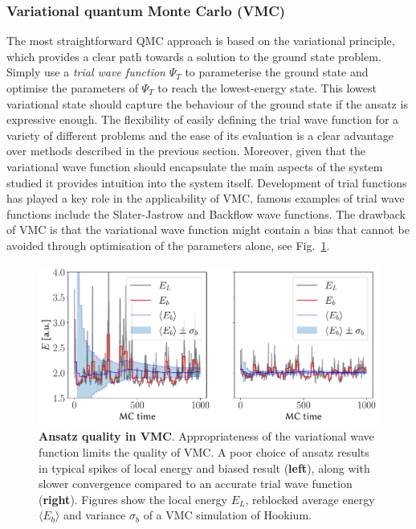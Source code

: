 \subsubsection{Variational quantum Monte Carlo (VMC)}
\label{sec:vmc}
The most straightforward QMC approach is based on the variational principle, which provides a clear path towards a solution to the ground state problem. Simply use a \emph{trial wave function} $\Psi_{T}$ to parameterise the ground state and optimise the parameters of $\Psi_{T}$ to reach the lowest-energy state. This lowest variational state should capture the behaviour of the ground state if the ansatz is expressive enough. The flexibility of easily defining the trial wave function for a variety of different problems and the ease of its evaluation is a clear advantage over methods described in the previous section. Moreover, given that the variational wave function should encapsulate the main aspects of the system studied it provides intuition into the system itself. Development of trial functions has played a key role in the applicability of VMC, famous examples of trial wave functions include the Slater-Jastrow and Backflow wave functions. The drawback of VMC is that the variational wave function might contain a bias that cannot be avoided through optimisation of the parameters alone, see Fig.~\ref{fig:qmc_blocking}. 
\begin{figure}[h]
	\centering
	\includegraphics[width=\linewidth]{Chapter2/Figs/Vector/blocking}
	\caption[Ansatz quality in VMC]{\textbf{Ansatz quality in VMC}. Appropriateness of the variational wave function limits the quality of VMC. A poor choice of ansatz results in typical spikes of local energy  and biased result (\textbf{left}), along with slower convergence compared to an accurate trial wave function (\textbf{right}). Figures show the local energy $E_L$, reblocked average energy $\langle E_b \rangle$ and variance $\sigma_b$ of a VMC simulation of Hookium.}
	\label{fig:qmc_blocking}
\end{figure}

